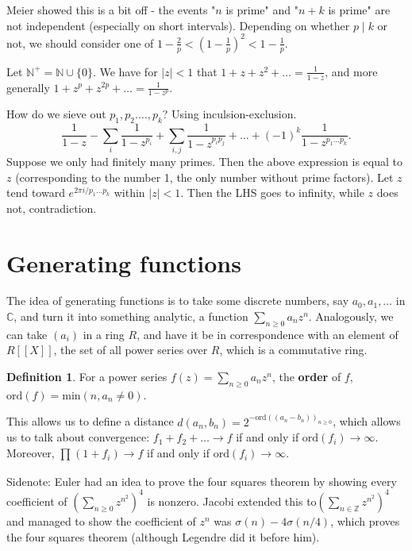 \documentclass{article}
\theoremstyle{definition}
\newtheorem{defn}{Definition}[section]
\begin{document}
Meier showed this is a bit off - the events "$n$ is prime" and "$n+k$ is prime" are not independent (especially on short intervals). Depending on whether $p \mid k$ or not, we should consider one of $1 - \frac{2}{p} < (1 - \frac{1}{p})^2 < 1 - \frac{1}{p}$.

\vspace{1mm}

Let $\mathbb{N}^+ = \mathbb{N} \cup \{ 0\}$. We have for $|z|<1$ that $1+z+z^2+\ldots = \frac{1}{1-z}$, and more generally $1 + z^p + z^{2p} + \ldots = \frac{1}{1-z^p}$.

How do we sieve out $p_1, p_2. \ldots, p_k$? Using inculsion-exclusion.
\[
\frac{1}{1-z} - \sum_{i}^{} \frac{1}{1-z^{p_i}} + \sum_{i,j}^{} \frac{1}{1-z^{p_i p_j}} + \ldots + (-1)^k \frac{1}{1 - z^{p_1\ldots p_k}}.
\]
Suppose we only had finitely many primes. Then the above expression is equal to $z$ (corresponding to the number 1, the only number without prime factors). Let $z$ tend toward $e^{2\pi i / p_1\ldots p_k}$ within $|z|<1$. Then the LHS goes to infinity, while $z$ does not, contradiction.

\section{Generating functions}

The idea of generating functions is to take some discrete numbers, say $a_0, a_1,\ldots$ in $\mathbb{C}$, and turn it into something analytic, a function $\sum_{n\ge 0}^{} a_nz^n$. Analogously, we can take $(a_i)$ in a ring $R$, and have it be in correspondence with an element of $R[[X]]$, the set of all power series over $R$, which is a commutative ring.
\begin{defn}
    For a power series $f(z) = \sum_{n\ge 0}^{} a_nz^n$, the \textbf{order} of $f$, $\text{ord}(f) = \text{min}(n, a_n \neq 0)$.
\end{defn}
This allows us to define a distance $d(a_n,b_n) = 2^{-\text{ord}((a_n-b_n))_{n\ge 0}}$, which allows us to talk about convergence: $f_1 + f_2 + \ldots \to f$ if and only if $\text{ord}(f_i) \to \infty$. Moreover, $\prod_{}^{} (1+f_i) \to f$ if and only if $\text{ord}(f_i) \to \infty$.
\vspace{1mm}

Sidenote: Euler had an idea to prove the four squares theorem by showing every coefficient of $(\sum_{n\ge 0}^{} z^{n^2})^4$ is nonzero. Jacobi extended this to$(\sum_{n \in \mathbb{Z}}^{} z^{n^2})^4$ and managed to show the coefficient of $z^n$ was $\sigma(n)-4\sigma(n/4)$, which proves the four squares theorem (although Legendre did it before him).
\vspace{2mm}
\end{document}
